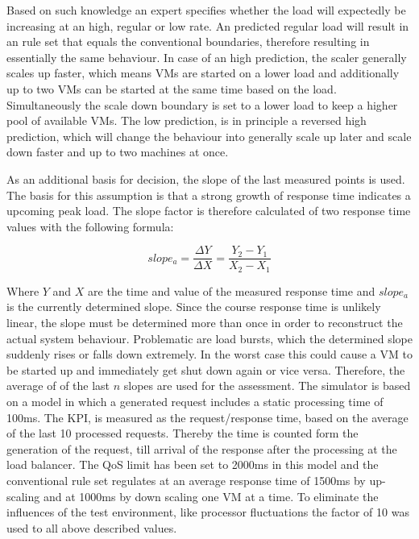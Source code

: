 
Based on such knowledge an expert specifies whether the load will expectedly be increasing at an high, regular or low rate. An predicted regular load will result in an rule set that equals the conventional boundaries,  therefore resulting in essentially the same behaviour. In case of an high prediction, the scaler generally scales up faster, which means VMs are started on a lower load and additionally up to two VMs can be started at the same time based on the load. Simultaneously the scale down boundary is set to a lower load to keep a higher pool of available VMs. The low prediction, is in principle a reversed high prediction, which will change the behaviour into generally scale up later and scale down faster and up to two machines at once. 

As an additional basis for decision, the slope of the last measured points is used. The basis for this assumption is that a strong growth of response time indicates a upcoming peak load. The slope factor is therefore calculated of two response time values with the following formula:

\begin{equation}
slope_{a} = \frac{\Delta Y}{\Delta X} = \frac{Y_{2} -Y_{1}}{X_{2}-X_{1}}
\end{equation}

Where $ Y $ and $ X $ are the time and value of the measured response time and $slope_{a}$ is the currently determined slope. Since the course response time is unlikely linear, the slope must be determined more than once in order to reconstruct the actual system behaviour. Problematic are load bursts, which the determined slope suddenly rises or falls down extremely. In the worst case this could cause a VM to be started up and immediately get shut down again or vice versa. Therefore, the average of of the last $n$ slopes are used for the assessment. 
The simulator is based on a model in which a generated request includes a static processing time of 100ms. The KPI, is measured as the request/response time, based on the average of the last 10 processed requests. Thereby the time is counted form the generation of the request, till arrival of the response after the processing at the load balancer. The QoS limit has been set to 2000ms in this model and the conventional rule set regulates at an average response time of 1500ms by up-scaling and at 1000ms by down scaling one VM at a time. To eliminate the influences of the test environment, like processor fluctuations the factor of 10 was used to all above described values.

